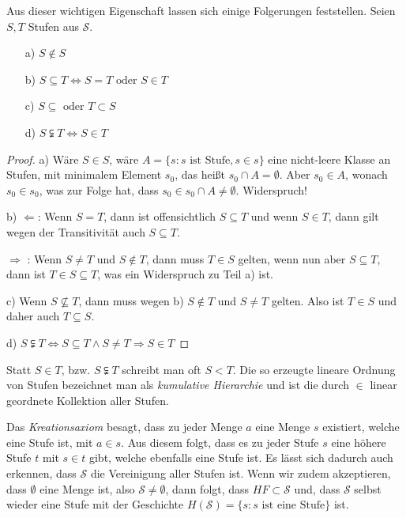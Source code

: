 Aus dieser wichtigen Eigenschaft lassen sich einige Folgerungen feststellen. Seien $S, T$ Stufen aus $\mathcal{S}$.
\begin{enumerate}
	\item[a)] $S\notin S$
	\item[b)] $S\subseteq T \Leftrightarrow S=T \text{ oder } S \in T$
	\item[c)] $S\subseteq \text{ oder } T\subset S$
	\item[d)] $S\subsetneqq T \Leftrightarrow S\in T$
\end{enumerate}
\begin{proof}
	a) Wäre $S\in S$, wäre $A=\{s : s \text{ ist Stufe}, s\in s\}$ eine nicht-leere Klasse an Stufen, mit minimalem Element $s_0$, das heißt $s_0\cap A=\emptyset$. 
	Aber $s_0\in A$, wonach $s_0\in s_0$, was zur Folge hat, dass $s_0\in s_0\cap A\neq \emptyset$. Widerspruch!
	
	b) \glqq$\Leftarrow$\grqq: Wenn $S=T$, dann ist offensichtlich $S\subseteq T$ und wenn $S\in T$, dann gilt wegen der Transitivität auch $S\subseteq T$.
	
	\glqq $\Rightarrow$ \grqq: Wenn $S\neq T$ und $S\notin T$, dann muss $T\in S$ gelten, wenn nun aber $S\subseteq T$, dann ist $T\in S\subseteq T$, was ein Widerspruch zu Teil a) ist.
	
	c) Wenn $S\not\subseteq T$, dann muss wegen b) $S\notin T$ und $S\neq T$ gelten. Also ist $T\in S$ und daher auch $T\subseteq S$.
	
	d) $S\subsetneqq T \Leftrightarrow S\subseteq T \land S\neq T \Rightarrow S\in T$
\end{proof}

Statt $S\in T$, bzw. $S\subsetneqq T$ schreibt man oft $S<T$. Die so erzeugte lineare Ordnung von Stufen bezeichnet man als \textit{kumulative Hierarchie} und ist die durch $\in$ linear geordnete Kollektion aller Stufen.

Das \textit{Kreationsaxiom} besagt, dass zu jeder Menge $a$ eine Menge $s$ existiert, welche eine Stufe ist, mit $a\in s$. Aus diesem folgt, dass es zu jeder Stufe $s$ eine höhere Stufe $t$ mit $s\in t$ gibt, welche ebenfalls eine Stufe ist. Es lässt sich dadurch auch erkennen, dass $\mathcal{S}$ die Vereinigung aller Stufen ist. Wenn wir zudem akzeptieren, dass $\emptyset$ eine Menge ist, also $\mathcal{S}\neq \emptyset$, dann folgt, dass $HF\subset \mathcal{S}$ und, dass $\mathcal{S}$ selbst wieder eine Stufe mit der Geschichte $H(\mathcal{S})=\{s: s\text{ ist eine Stufe}\}$ ist.

